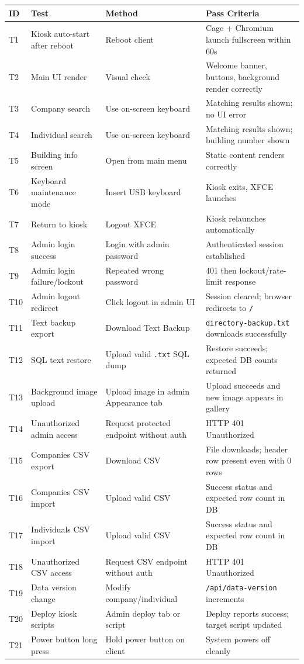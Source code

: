 \documentclass[11pt,letterpaper]{article}
\begin{document}
\begin{longtable}{p{0.6in} p{2.0in} p{1.6in} p{1.7in}}
ID & Test & Method & Pass Criteria \\
\hline
T1 & Kiosk auto-start after reboot & Reboot client & Cage + Chromium launch fullscreen within 60s \\
T2 & Main UI render & Visual check & Welcome banner, buttons, background render correctly \\
T3 & Company search & Use on-screen keyboard & Matching results shown; no UI error \\
T4 & Individual search & Use on-screen keyboard & Matching results shown; building number shown \\
T5 & Building info screen & Open from main menu & Static content renders correctly \\
T6 & Keyboard maintenance mode & Insert USB keyboard & Kiosk exits, XFCE launches \\
T7 & Return to kiosk & Logout XFCE & Kiosk relaunches automatically \\
T8 & Admin login success & Login with admin password & Authenticated session established \\
T9 & Admin login failure/lockout & Repeated wrong password & 401 then lockout/rate-limit response \\
T10 & Admin logout redirect & Click logout in admin UI & Session cleared; browser redirects to \texttt{/} \\
T11 & Text backup export & Download Text Backup & \texttt{directory-backup.txt} downloads successfully \\
T12 & SQL text restore & Upload valid \texttt{.txt} SQL dump & Restore succeeds; expected DB counts returned \\
T13 & Background image upload & Upload image in admin Appearance tab & Upload succeeds and new image appears in gallery \\
T14 & Unauthorized admin access & Request protected endpoint without auth & HTTP 401 Unauthorized \\
T15 & Companies CSV export & Download CSV & File downloads; header row present even with 0 rows \\
T16 & Companies CSV import & Upload valid CSV & Success status and expected row count in DB \\
T17 & Individuals CSV import & Upload valid CSV & Success status and expected row count in DB \\
T18 & Unauthorized CSV access & Request CSV endpoint without auth & HTTP 401 Unauthorized \\
T19 & Data version change & Modify company/individual & \texttt{/api/data-version} increments \\
T20 & Deploy kiosk scripts & Admin deploy tab or script & Deploy reports success; target script updated \\
T21 & Power button long press & Hold power button on client & System powers off cleanly \\
\end{longtable}
\end{document}
